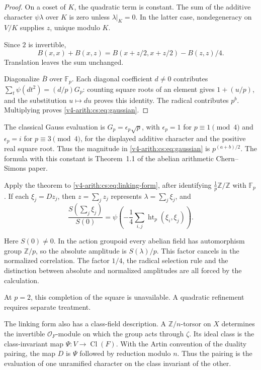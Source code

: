 \begin{proof}
On a coset of \(K\), the quadratic term is constant. The sum of the additive
character \(\psi\lambda\) over \(K\) is zero unless \(\lambda|_K=0\). In the
latter case, nondegeneracy on \(V/K\) supplies \(z\), unique modulo \(K\).

Since \(2\) is invertible,
\[
 B(x,x)+B(x,z)=B(x+z/2,x+z/2)-B(z,z)/4.
\]
Translation leaves the sum unchanged.

Diagonalize \(\overline B\) over \(\mathbb F_p\). Each diagonal coefficient
\(d\ne0\) contributes \(\sum_t\psi(dt^2)=(d/p)G_p\): counting square roots
of an element gives \(1+(u/p)\), and the substitution \(u\mapsto du\) proves
this identity. The radical contributes \(p^b\). Multiplying proves
\eqref{v4-arith:cs:eq:gaussian}.
\end{proof}

The classical Gauss evaluation is \(G_p=\epsilon_p\sqrt p\), with
\(\epsilon_p=1\) for \(p\equiv1\pmod4\) and \(\epsilon_p=i\) for
\(p\equiv3\pmod4\), for the displayed additive character and the positive
real square root. Thus the magnitude in \eqref{v4-arith:cs:eq:gaussian} is
\(p^{(a+b)/2}\). The formula with this constant is Theorem~1.1 of the
abelian arithmetic Chern--Simons paper.

Apply the theorem to \eqref{v4-arith:cs:eq:linking-form}, after identifying
\(\tfrac1p\mathbb Z/\mathbb Z\) with \(\mathbb F_p\). If each
\(\xi_j=Dz_j\), then \(z=\sum_jz_j\) represents \(\lambda=\sum_j\xi_j\), and
\begin{equation}
 \frac{S(\sum_j\xi_j)}{S(0)}
 =\psi\left(-\frac14\sum_{i,j}
                  \operatorname{ht}_p(\xi_i,\xi_j)\right).
 \label{v4-arith:cs:eq:wilson-linking}
\end{equation}

Here \(S(0)\ne0\). In the action groupoid every abelian field has
automorphism group \(\mathbb Z/p\), so the absolute amplitude is
\(S(\lambda)/p\). This factor cancels in the normalized correlation. The
factor \(1/4\), the radical selection rule and the distinction between
absolute and normalized amplitudes are all forced by the calculation.

At \(p=2\), this completion of the square is unavailable. A quadratic
refinement requires separate treatment.

The linking form also has a class-field description. A \(\mathbb
Z/n\)-torsor on \(X\) determines the invertible \(\mathcal O_F\)-module on
which the group acts through \(\zeta\). Its ideal class is the
class-invariant map \(\Psi:V\to\operatorname{Cl}(F)\). With the Artin
convention of the duality pairing, the map \(D\) is \(\Psi\) followed by
reduction modulo \(n\). Thus the pairing is the evaluation of one unramified
character on the class invariant of the other.

